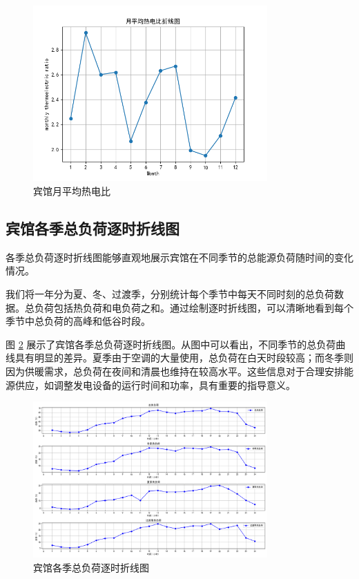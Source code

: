 \documentclass[UTF8]{ctexart}
\begin{document}
\begin{figure}[H]
    \centering
    \includegraphics[width=0.8\textwidth]{image/Figure_1.png}
    \caption{宾馆月平均热电比}
    \label{fig:monthly_thermoelectric_ratio}
\end{figure}

\subsection{宾馆各季总负荷逐时折线图}
各季总负荷逐时折线图能够直观地展示宾馆在不同季节的总能源负荷随时间的变化情况。

我们将一年分为夏、冬、过渡季，分别统计每个季节中每天不同时刻的总负荷数据。总负荷包括热负荷和电负荷之和。通过绘制逐时折线图，可以清晰地看到每个季节中总负荷的高峰和低谷时段。

图 \ref{fig:seasonal_total_load} 展示了宾馆各季总负荷逐时折线图。从图中可以看出，不同季节的总负荷曲线具有明显的差异。夏季由于空调的大量使用，总负荷在白天时段较高；而冬季则因为供暖需求，总负荷在夜间和清晨也维持在较高水平。这些信息对于合理安排能源供应，如调整发电设备的运行时间和功率，具有重要的指导意义。

\begin{figure}[H]
    \centering
    \includegraphics[width=0.8\textwidth]{image/Figure_2.png}
    \caption{宾馆各季总负荷逐时折线图}
    \label{fig:seasonal_total_load}
\end{figure}
\end{document}

